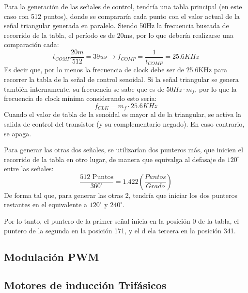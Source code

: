 \documentclass[e4_tp3_main.tex]{subfiles}
\begin{document}
Para la generación de las señales de control, tendría una tabla principal (en este caso con 512 puntos), donde se compararía cada punto con el valor actual de la señal triangular generada en paralelo. Siendo 50Hz la frecuencia buscada de recorrido de la tabla, el período es de 20ms, por lo que debería realizarse una comparación cada:
\[
t_{COMP}\frac{20m}{512} = 39us \longrightarrow f_{COMP} = \frac{1}{t_{COMP}} = 25.6KHz 
\]
Es decir que, por lo menos la frecuencia de clock debe ser de 25.6KHz para recorrer la tabla de la señal de control senoidal. Si la señal triangular se genera también internamente, su frecuencia se sabe que es de $50Hz\cdot m_f$, por lo que la frecuencia de clock mínima considerando esto sería:
\[
f_{CLK} = m_f \cdot 25.6KHz
\]
Cuando el valor de tabla de la senoidal es mayor al de la triangular, se activa la salida de control del transistor (y su complementario negado). En caso contrario, se apaga.\par
Para generar las otras dos señales, se utilizarían dos punteros más, que inicien el recorrido de la tabla en otro lugar, de manera que equivalga al defasaje de $120^{\circ}$ entre las señales:
\[
\frac{512 \textrm{ Puntos}}{360^{\circ}} = 1.422 \left( \frac{Puntos}{Grado} \right)
\]
De forma tal que, para generar las otras 2, tendría que iniciar los dos punteros restantes en el equivalente a $120^{\circ}$ y $240^{\circ}$.\par
Por lo tanto, el puntero de la primer señal inicia en la posición 0 de la tabla, el puntero de la segunda en la posición 171, y el d ela tercera en la posición 341. 


\subsection{Modulación PWM}

\subsection{Motores de inducción Trifásicos}
\end{document}
